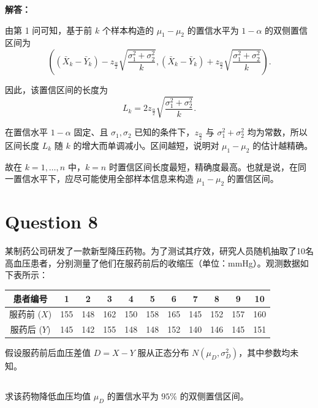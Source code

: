 \documentclass[12pt,a4paper]{article}
\begin{document}
\begin{answerbox}
\textbf{解答：}

由第 1 问可知，基于前 $k$ 个样本构造的 $\mu_1-\mu_2$ 的置信水平为 $1-\alpha$ 的双侧置信区间为
\[
\left((\bar{X}_k-\bar{Y}_k)-z_{\frac{\alpha}{2}}\sqrt{\frac{\sigma_1^2+\sigma_2^2}{k}},
(\bar{X}_k-\bar{Y}_k)+z_{\frac{\alpha}{2}}\sqrt{\frac{\sigma_1^2+\sigma_2^2}{k}}\right).
\]

因此，该置信区间的长度为
\[
L_k
=2z_{\frac{\alpha}{2}}\sqrt{\frac{\sigma_1^2+\sigma_2^2}{k}}.
\]

在置信水平 $1-\alpha$ 固定、且 $\sigma_1,\sigma_2$ 已知的条件下，$z_{\frac{\alpha}{2}}$ 与 $\sigma_1^2+\sigma_2^2$ 均为常数，所以区间长度 $L_k$ 随 $k$ 的增大而单调减小。区间越短，说明对 $\mu_1-\mu_2$ 的估计越精确。

故在 $k=1,\ldots,n$ 中，$k=n$ 时置信区间长度最短，精确度最高。也就是说，在同一置信水平下，应尽可能使用全部样本信息来构造 $\mu_1-\mu_2$ 的置信区间。

\end{answerbox}

\section{Question 8}

某制药公司研发了一款新型降压药物。为了测试其疗效，研究人员随机抽取了10名高血压患者，分别测量了他们在服药前后的收缩压（单位：mmHg）。观测数据如下表所示：

\begin{center}
\begin{tabular}{ccccccccccc}
\toprule
患者编号 & 1 & 2 & 3 & 4 & 5 & 6 & 7 & 8 & 9 & 10 \\
\midrule
服药前 ($X$) & 155 & 148 & 162 & 150 & 158 & 165 & 145 & 152 & 157 & 160 \\
服药后 ($Y$) & 145 & 142 & 155 & 148 & 148 & 152 & 140 & 146 & 145 & 151 \\
\bottomrule
\end{tabular}
\end{center}

假设服药前后血压差值 $D = X-Y$ 服从正态分布 $N(\mu_D,\sigma_D^2)$，其中参数均未知。

\subsection{}

求该药物降低血压均值 $\mu_D$ 的置信水平为 $95\%$ 的双侧置信区间。
\end{document}
